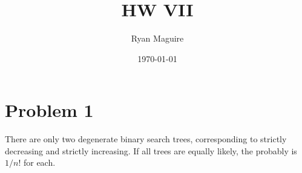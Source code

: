 \documentclass{article}
\title{HW VII}
\author{Ryan Maguire}
\date{\today}
\begin{document}
    \maketitle
    \section*{Problem 1}
        There are only two degenerate binary search trees, corresponding to
        strictly decreasing and strictly increasing. If all trees are equally
        likely, the probably is $1/n!$ for each.
\end{document}
